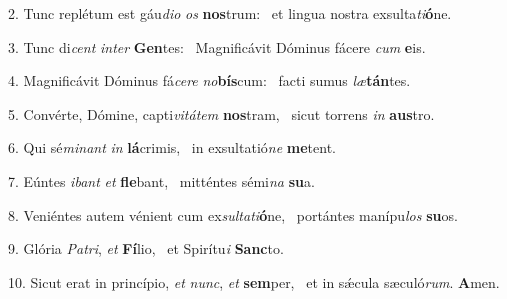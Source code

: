 2. Tunc replétum est gáu\textit{di}\textit{o} \textit{os} \textbf{nos}trum: \ast\  et lingua nostra exsulta\textit{ti}\textbf{ó}ne.\

3. Tunc di\textit{cent} \textit{in}\textit{ter} \textbf{Gen}tes: \ast\  Magnificávit Dóminus fácere \textit{cum} \textbf{e}is.\

4. Magnificávit Dóminus fá\textit{ce}\textit{re} \textit{no}\textbf{bís}cum: \ast\  facti sumus \textit{læ}\textbf{tán}tes.\

5. Convérte, Dómine, capti\textit{vi}\textit{tá}\textit{tem} \textbf{nos}tram, \ast\  sicut torrens \textit{in} \textbf{aus}tro.\

6. Qui sé\textit{mi}\textit{nant} \textit{in} \textbf{lá}crimis, \ast\  in exsultatió\textit{ne} \textbf{me}tent.\

7. Eúntes \textit{i}\textit{bant} \textit{et} \textbf{fle}bant, \ast\  mitténtes sémi\textit{na} \textbf{su}a.\

8. Veniéntes autem vénient cum ex\textit{sul}\textit{ta}\textit{ti}\textbf{ó}ne, \ast\  portántes manípu\textit{los} \textbf{su}os.\

9. Glória \textit{Pa}\textit{tri}, \textit{et} \textbf{Fí}lio, \ast\  et Spirítu\textit{i} \textbf{Sanc}to.\

10. Sicut erat in princípio, \textit{et} \textit{nunc}, \textit{et} \textbf{sem}per, \ast\  et in sǽcula sæculó\textit{rum}. \textbf{A}men.\

